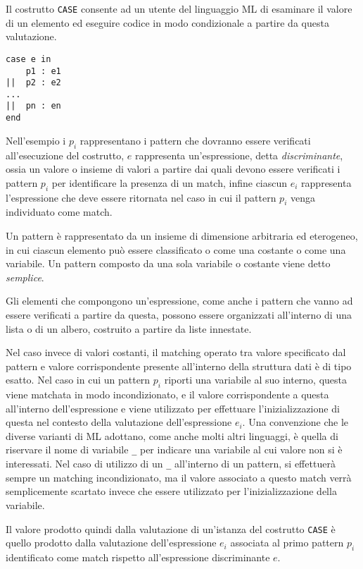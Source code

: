 Il costrutto \texttt{CASE} consente ad un utente del linguaggio ML di esaminare
il valore di un elemento ed eseguire codice in modo condizionale a partire da
questa valutazione.

\begin{lstlisting}[caption=Il costrutto \texttt{CASE} presente in LML
  rappresenta un esempio di supporto al pattern matching.]
case e in
    p1 : e1
||  p2 : e2
...
||  pn : en
end
\end{lstlisting}

Nell'esempio i $p_i$ rappresentano i pattern che dovranno essere verificati
all’esecuzione del costrutto, $e$ rappresenta un’espressione, detta 
\textit{discriminante}, ossia un valore o insieme di valori a partire dai quali
devono essere verificati i pattern $p_i$ per identificare la presenza di
un match, infine ciascun $e_i$ rappresenta l'espressione che deve essere
ritornata nel caso in cui il pattern $p_i$ venga individuato come match.

Un pattern è rappresentato da un insieme di dimensione arbitraria ed
eterogeneo, in cui ciascun elemento può essere classificato o come una costante
o come una variabile. Un pattern composto da una sola variabile o costante
viene detto \textit{semplice}.

Gli elementi che compongono un'espressione, come anche i pattern che vanno ad
essere verificati a partire da questa, possono essere organizzati all’interno
di una lista o di un albero, costruito a partire da liste innestate.

Nel caso invece di valori costanti, il matching operato tra valore specificato
dal pattern e valore corrispondente presente all'interno della struttura dati è
di tipo esatto. Nel caso in cui un pattern $p_i$ riporti una variabile al suo
interno, questa viene matchata in modo incondizionato, e il valore
corrispondente a questa all’interno dell’espressione e viene utilizzato per
effettuare l’inizializzazione di questa nel contesto della valutazione
dell'espressione $e_i$. Una convenzione che le diverse varianti di ML adottano,
come anche molti altri linguaggi, è quella di riservare il nome di variabile
\texttt{\_} per indicare una variabile al cui valore non si è interessati. Nel
caso di utilizzo di un \texttt{\_} all’interno di un pattern, si effettuerà
sempre un matching incondizionato, ma il valore associato a questo match verrà
semplicemente scartato invece che essere utilizzato per l’inizializzazione
della variabile.

Il valore prodotto quindi dalla valutazione di un'istanza del costrutto
\texttt{CASE} è quello prodotto dalla valutazione dell’espressione $e_i$
associata al primo pattern $p_i$ identificato come match rispetto
all’espressione discriminante $e$.\\

